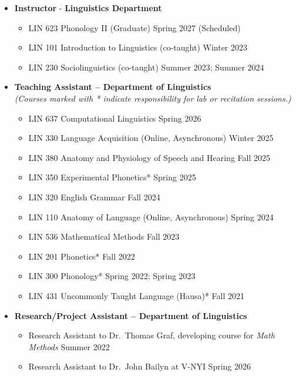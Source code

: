 \documentclass[a4paper,11pt]{article}
\newcommand{\cvsubsection}[1]{\noindent{\textsc{#1}}}
\begin{document}
\cvsubsection{\sc{SUNY Stony Brook University}}
\begin{itemize}[itemsep=0em, parsep=0.5em, topsep=0em]
\item \textbf{Instructor} - \textbf{Linguistics Department}  
\begin{itemize}[itemsep=0em, parsep=0.2em, topsep=0em]
    \item LIN 623   \quad Phonology II (Graduate) \hfill Spring 2027 (Scheduled)
    \item LIN 101   \quad Introduction to Linguistics (co-taught) \hfill Winter 2023
    \item LIN 230 \quad  Sociolinguistics (co-taught) \hfill Summer 2023; Summer 2024\\
\end{itemize}
\item \noindent\textbf{Teaching Assistant – Department of Linguistics} \\
{\footnotesize\textit{(Courses marked with * indicate responsibility for lab or recitation sessions.)}}

\begin{itemize}[itemsep=0em, parsep=0.3em, topsep=0em]
    \item LIN 637 \quad  Computational Linguistics \hfill Spring 2026
    \item LIN 330 \quad  Language Acquisition (Online, Asynchronous) \hfill Winter 2025 
    \item LIN 380 \quad  Anatomy and Physiology of Speech and Hearing \hfill Fall 2025
    \item LIN 350 \quad  Experimental Phonetics* \hfill Spring 2025
    \item LIN 320 \quad English Grammar \hfill Fall 2024
    \item LIN 110 \quad  Anatomy of Language (Online, Asynchronous) \hfill Spring 2024
    \item LIN 536 \quad Mathematical Methods \hfill Fall 2023
    \item LIN 201 \quad Phonetics* \hfill Fall 2022
    \item LIN 300 \quad Phonology* \hfill Spring 2022; Spring 2023
    \item LIN 431 \quad Uncommonly Taught Language (Hausa)* \hfill Fall 2021\\
\end{itemize}

\item \textbf{Research/Project Assistant – Department of Linguistics}\par
\begin{itemize}[itemsep=0em, parsep=0.3em, topsep=0em]
    \item Research Assistant to Dr.\ Thomas Graf, developing course for \textit{Math Methods} \hfill Summer 2022
    \item Research Assistant to Dr.\ John Bailyn at V-NYI  \hfill Spring 2026\\
\end{itemize}


\end{itemize}
\end{document}
